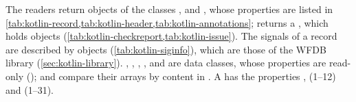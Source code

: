The readers return objects of the classes ,  and
, whose properties are listed in
\cref{tab:kotlin-record,tab:kotlin-header,tab:kotlin-annotations}; 
returns a , which holds  objects
(\cref{tab:kotlin-checkreport,tab:kotlin-issue}). The signals of a record are described
by  objects (\cref{tab:kotlin-siginfo}), which are those of the WFDB library
(\cref{sec:kotlin-library}). , , ,
,  and  are data classes, whose properties
are read-only ();  and  compare their arrays by
content in . A  has the properties , 
(1--12) and  (1--31).

